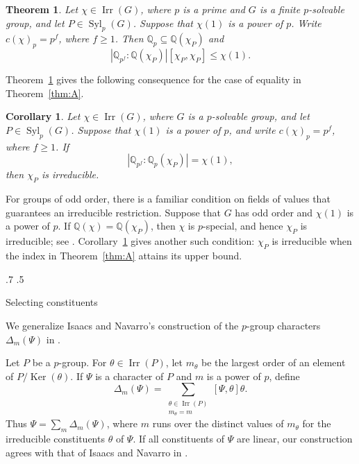 \documentclass[reqno]{amsart}
\makeatletter
\theoremstyle{definition}
\theoremstyle{remark}
\numberwithin{equation}{section}
\DeclareMathOperator{\Irr}{Irr}
\DeclareMathOperator{\Syl}{Syl}
\DeclareMathOperator{\Ker}{Ker}
\theoremstyle{plain}
\newtheorem{theoremB}[theoremA]{Theorem}
\newtheorem{corollaryC}[theoremA]{Corollary}
\renewcommand{\section}{%
  \@startsection{section}{1}{\z@}%
    {.7\linespacing\@plus\linespacing}%
    {.5\linespacing}%
    {\normalfont\bfseries\raggedright
     \let\@secnumfont\bfseries}%
}
\makeatother
\begin{document}
\begin{theoremB}\label{thm:B}
Let $\chi\in\Irr(G)$, where $p$ is a prime and $G$ is a finite
$p$-solvable group, and let $P\in\Syl_p(G)$. Suppose that
$\chi(1)$ is a power of $p$. Write $c(\chi)_p=p^f$, where
$f\geq1$. Then $\mathbb{Q}_p\subseteq\mathbb{Q}(\chi_P)$ and
\[
 \left|\mathbb{Q}_{p^f}:\mathbb{Q}(\chi_P)\right|
 [\chi_P,\chi_P]\leq\chi(1).
\]
\end{theoremB}

Theorem~\ref{thm:B} gives the following consequence for the case of
equality in Theorem~\ref{thm:A}.

\begin{corollaryC}\label{cor:C}
Let $\chi\in\Irr(G)$, where $G$ is a $p$-solvable group, and let
$P\in\Syl_p(G)$.
Suppose that $\chi(1)$ is a power of $p$, and write
$c(\chi)_p=p^f$, where $f\geq1$.
If
\[
  \left|\mathbb{Q}_{p^f}:\mathbb{Q}_p(\chi_P)\right|
  =\chi(1),
\]
then $\chi_P$ is irreducible.
\end{corollaryC}

For groups of odd order, there is a familiar condition on
fields of values that guarantees an irreducible restriction.
Suppose that $G$ has odd order and $\chi(1)$ is a power of $p$.
If $\mathbb{Q}(\chi)=\mathbb{Q}(\chi_P)$, then $\chi$ is
$p$-special, and hence $\chi_P$ is irreducible; see
\cite[Theorems~2.10 and~2.26]{I2018}. Corollary~\ref{cor:C} gives another
such condition: $\chi_P$ is irreducible when the index in
Theorem~\ref{thm:A} attains its upper bound.


\section{Selecting constituents}
\label{sec:selection}

We generalize Isaacs and Navarro's construction of the
$p$-group characters $\Delta_m(\Psi)$ in \cite{IN}.

Let $P$ be a $p$-group. For $\theta\in\Irr(P)$, let $m_\theta$
be the largest order of an element of $P/\Ker(\theta)$.
If $\Psi$ is a character of $P$ and $m$ is a power of $p$, define
\[
  \Delta_m(\Psi)=
  \sum_{\substack{\theta\in\Irr(P)\\m_\theta=m}}
  [\Psi,\theta]\theta.
\]
Thus $\Psi=\sum_m\Delta_m(\Psi)$, where $m$ runs over the distinct
values of $m_\theta$ for the irreducible constituents $\theta$ of $\Psi$.
If all constituents of $\Psi$ are linear, our construction agrees
with that of Isaacs and Navarro in \cite{IN}.
\end{document}
